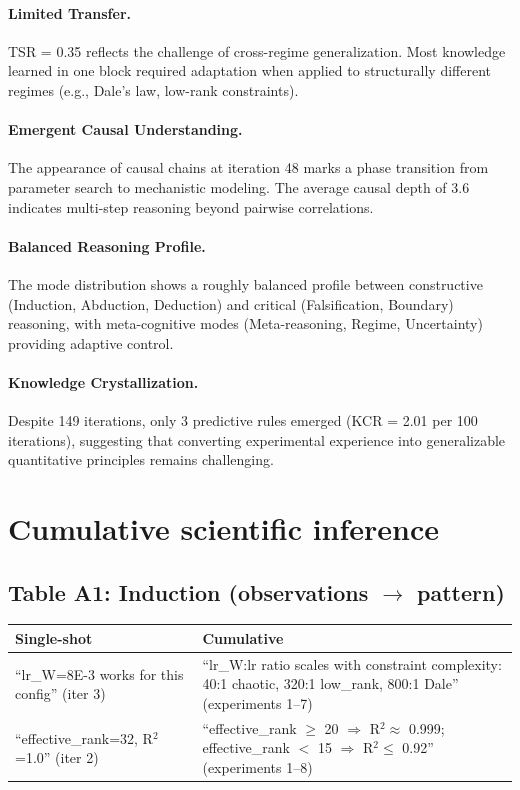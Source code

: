 \documentclass[10pt,twocolumn]{article}
\begin{document}
\paragraph{Limited Transfer.} TSR = 0.35 reflects the challenge of cross-regime generalization. Most knowledge learned in one block required adaptation when applied to structurally different regimes (e.g., Dale's law, low-rank constraints).

\paragraph{Emergent Causal Understanding.} The appearance of causal chains at iteration 48 marks a phase transition from parameter search to mechanistic modeling. The average causal depth of 3.6 indicates multi-step reasoning beyond pairwise correlations.

\paragraph{Balanced Reasoning Profile.} The mode distribution shows a roughly balanced profile between constructive (Induction, Abduction, Deduction) and critical (Falsification, Boundary) reasoning, with meta-cognitive modes (Meta-reasoning, Regime, Uncertainty) providing adaptive control.

\paragraph{Knowledge Crystallization.} Despite 149 iterations, only 3 predictive rules emerged (KCR = 2.01 per 100 iterations), suggesting that converting experimental experience into generalizable quantitative principles remains challenging.


\section{Cumulative scientific inference}

\renewcommand{\arraystretch}{1.3}

\subsection*{Table A1: Induction (observations $\rightarrow$ pattern)}

\begin{table}[h!]
\centering
\small
\begin{tabularx}{\textwidth}{XX}
\toprule
\textbf{Single-shot} & \textbf{Cumulative} \\
\midrule
``lr\_W=8E-3 works for this config'' (iter 3)
&
``lr\_W:lr ratio scales with constraint complexity: 40:1 chaotic, 320:1 low\_rank, 800:1 Dale'' (experiments 1--7)
\\
\midrule
``effective\_rank=32, R$^2$=1.0'' (iter 2)
&
``effective\_rank $\geq$ 20 $\Rightarrow$ R$^2 \approx$ 0.999; effective\_rank $<$ 15 $\Rightarrow$ R$^2 \leq$ 0.92'' (experiments 1--8)
\\
\bottomrule
\end{tabularx}
\end{table}
\end{document}
